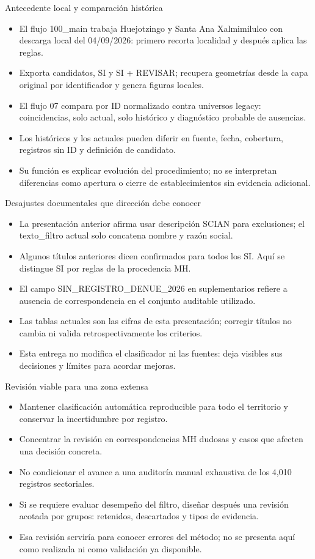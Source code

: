 \documentclass[aspectratio=169,10pt]{beamer}
\begin{document}
\begin{frame}{Antecedente local y comparación histórica}
\small
\begin{itemize}
\item El flujo 100\_main trabaja Huejotzingo y Santa Ana Xalmimilulco con descarga local del 04/09/2026: primero recorta localidad y después aplica las reglas.
\item Exporta candidatos, SI y SI + REVISAR; recupera geometrías desde la capa original por identificador y genera figuras locales.
\item El flujo 07 compara por ID normalizado contra universos legacy: coincidencias, solo actual, solo histórico y diagnóstico probable de ausencias.
\item Los históricos y los actuales pueden diferir en fuente, fecha, cobertura, registros sin ID y definición de candidato.
\item Su función es explicar evolución del procedimiento; no se interpretan diferencias como apertura o cierre de establecimientos sin evidencia adicional.
\end{itemize}
\end{frame}
\begin{frame}{Desajustes documentales que dirección debe conocer}
\small
\begin{itemize}
\item La presentación anterior afirma usar descripción SCIAN para exclusiones; el texto\_filtro actual solo concatena nombre y razón social.
\item Algunos títulos anteriores dicen confirmados para todos los SI. Aquí se distingue SI por reglas de la procedencia MH.
\item El campo SIN\_REGISTRO\_DENUE\_2026 en suplementarios refiere a ausencia de correspondencia en el conjunto auditable utilizado.
\item Las tablas actuales son las cifras de esta presentación; corregir títulos no cambia ni valida retrospectivamente los criterios.
\item Esta entrega no modifica el clasificador ni las fuentes: deja visibles sus decisiones y límites para acordar mejoras.
\end{itemize}
\end{frame}
\begin{frame}{Revisión viable para una zona extensa}
\small
\begin{itemize}
\item Mantener clasificación automática reproducible para todo el territorio y conservar la incertidumbre por registro.
\item Concentrar la revisión en correspondencias MH dudosas y casos que afecten una decisión concreta.
\item No condicionar el avance a una auditoría manual exhaustiva de los 4,010 registros sectoriales.
\item Si se requiere evaluar desempeño del filtro, diseñar después una revisión acotada por grupos: retenidos, descartados y tipos de evidencia.
\item Esa revisión serviría para conocer errores del método; no se presenta aquí como realizada ni como validación ya disponible.
\end{itemize}
\end{frame}
\end{document}
